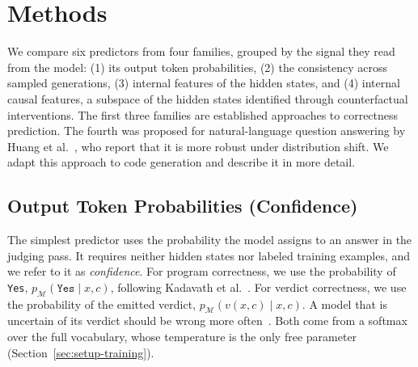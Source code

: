 \section{Methods}
\label{sec:methods}
We compare six predictors from four families, grouped by the signal they read
from the model: (1) its output token probabilities, (2) the consistency across
sampled generations, (3) internal features of the hidden states, and (4)
internal causal features, a subspace of the hidden states identified through counterfactual interventions. The first three families are established approaches to
correctness prediction. The fourth was proposed for natural-language question
answering by Huang et al.~\cite{Huang2025Internal}, who report that it is more robust under distribution shift. We adapt this approach to code generation %
and describe it in more detail.


\subsection{Output Token Probabilities (Confidence)}
\label{sec:methods-output}
The simplest predictor uses the probability the model assigns to an answer in the
judging pass. It requires neither hidden states nor labeled training examples,
and we refer to it as \emph{confidence}. For program correctness, we use the
probability of \texttt{Yes}, $p_{\mathcal{M}}(\texttt{Yes} \mid x, c)$,
following 
Kadavath et
al.~\cite{Kadavath2022LanguageM}. For verdict correctness, we use the
probability of the emitted verdict, $p_{\mathcal{M}}(v(x, c) \mid x, c)$.
A model that is uncertain of its verdict should be
wrong more often~\cite{Hendrycks2017Baseline}. Both come from a softmax over the full vocabulary, whose
temperature is the only free parameter (Section~\ref{sec:setup-training}).

